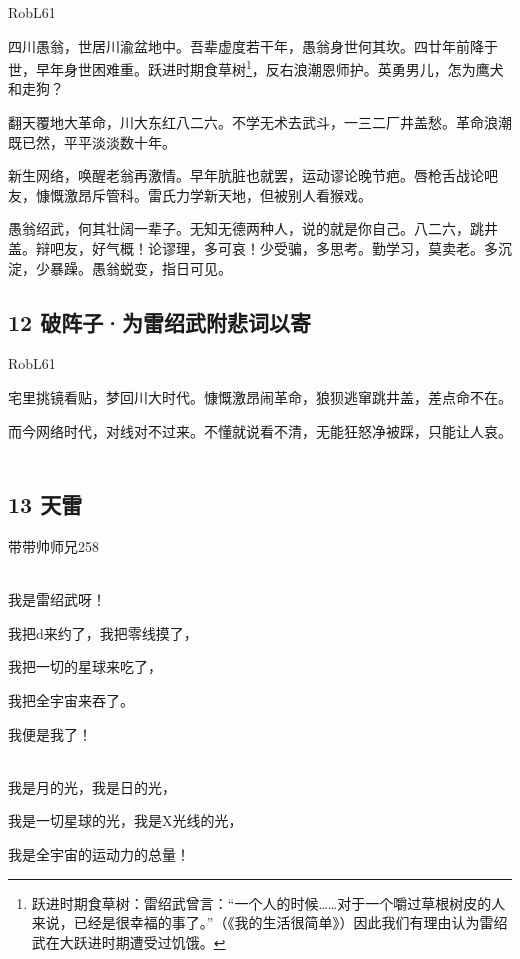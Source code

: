RobL61

四川愚翁，世居川渝盆地中。吾辈虚度若干年，愚翁身世何其坎。四廿年前降于世，早年身世困难重。跃进时期食草树\footnote{跃进时期食草树：雷绍武曾言：``一个人的时候\ldots\ldots 对于一个嚼过草根树皮的人来说，已经是很幸福的事了。''（《我的生活很简单》）因此我们有理由认为雷绍武在大跃进时期遭受过饥饿。}，反右浪潮恩师护。英勇男儿，怎为鹰犬和走狗？

翻天覆地大革命，川大东红八二六。不学无术去武斗，一三二厂井盖愁。革命浪潮既已然，平平淡淡数十年。

新生网络，唤醒老翁再激情。早年肮脏也就罢，运动谬论晚节疤。唇枪舌战论吧友，慷慨激昂斥管科。雷氏力学新天地，但被别人看猴戏。

愚翁绍武，何其壮阔一辈子。无知无德两种人，说的就是你自己。八二六，跳井盖。辩吧友，好气概！论谬理，多可哀！少受骗，多思考。勤学习，莫卖老。多沉淀，少暴躁。愚翁蜕变，指日可见。
~\\

\hypertarget{ux7834ux9635ux5b50ux4e3aux96f7ux7ecdux6b66ux9644ux60b2ux8bcdux4ee5ux5bc4}{%
\subsection{12
破阵子·为雷绍武附悲词以寄}\label{ux7834ux9635ux5b50ux4e3aux96f7ux7ecdux6b66ux9644ux60b2ux8bcdux4ee5ux5bc4}}

RobL61

宅里挑镜看贴，梦回川大时代。慷慨激昂闹革命，狼狈逃窜跳井盖，差点命不在。

而今网络时代，对线对不过来。不懂就说看不清，无能狂怒净被踩，只能让人哀。
~\\

\hypertarget{ux5929ux96f7}{%
\subsection{13 天雷}\label{ux5929ux96f7}}

带带帅师兄258

~\\
我是雷绍武呀！

我把d来约了，我把零线摸了，

我把一切的星球来吃了，

我把全宇宙来吞了。

我便是我了！

~\\
我是月的光，我是日的光，

我是一切星球的光，我是X光线的光，

我是全宇宙的运动力的总量！

